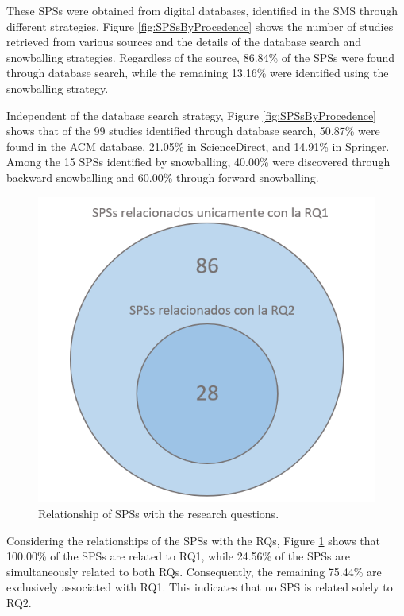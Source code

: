These SPSs were obtained from digital databases, identified in the SMS through different strategies. Figure \ref{fig:SPSsByProcedence} shows the number of studies retrieved from various sources and the details of the database search and snowballing strategies. Regardless of the source, 86.84\% of the SPSs were found through database search, while the remaining 13.16\% were identified using the snowballing strategy.

Independent of the database search strategy, Figure \ref{fig:SPSsByProcedence} shows that of the 99 studies identified through database search, 50.87\% were found in the ACM database, 21.05\% in ScienceDirect, and 14.91\% in Springer. Among the 15 SPSs identified by snowballing, 40.00\% were discovered through backward snowballing and 60.00\% through forward snowballing.

\begin{figure}[htbp]
	\centering
	\vspace{10pt}
	\includegraphics[scale=0.7]{resources/figures/Venn.png}
	\vspace{6pt}
	\caption{Relationship of SPSs with the research questions.}
	\label{fig:SPSsByRQs}
\end{figure}

Considering the relationships of the SPSs with the RQs, Figure \ref{fig:SPSsByRQs} shows that 100.00\% of the SPSs are related to RQ1, while 24.56\% of the SPSs are simultaneously related to both RQs. Consequently, the remaining 75.44\% are exclusively associated with RQ1. This indicates that no SPS is related solely to RQ2.

